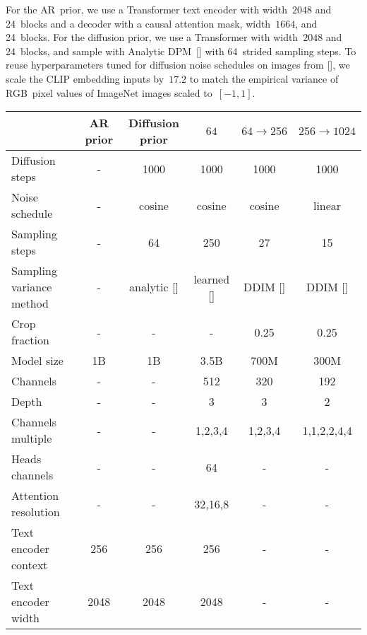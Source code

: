\documentclass{article}
\newcommand{\shortcite}[1]{[\citenum{#1}]}
\newcommand{\namecite}[1]{\citeauthor{#1} [\citenum{#1}]}
\begin{document}
For the AR~prior, we use a Transformer text encoder with width~$2048$ and 24~blocks and a decoder with a causal attention mask, width~$1664$, and 24~blocks. For the diffusion prior, we use a Transformer with width~$2048$ and 24~blocks, and sample with Analytic DPM~\shortcite{analyticddpm} with 64~strided sampling steps. To reuse hyperparameters tuned for diffusion noise schedules on images from \namecite{sotapaper}, we scale the CLIP embedding inputs by~$17.2$ to match the empirical variance of RGB~pixel values of ImageNet images scaled to~$[-1, 1]$. 
\begin{table}[h]
    \setlength\tabcolsep{4pt}
    \begin{center}
    \begin{small}
    \begin{tabular}{lccccc}
    \toprule
                         & AR prior & Diffusion prior & $64$ & $64 \rightarrow 256$ & $256 \rightarrow 1024$\\
    \midrule
    Diffusion steps      & -         & 1000    & 1000    & 1000    & 1000 \\
    Noise schedule       & -         & cosine  & cosine  & cosine  & linear \\
    Sampling steps       & -         & 64      & 250     & 27      & 15 \\
    Sampling variance method & -     & analytic \shortcite{analyticddpm} & learned \shortcite{improved} & DDIM \shortcite{ddim}    & DDIM \shortcite{ddim} \\
    Crop fraction        & -         & -       & -       & 0.25    & 0.25 \\
    Model size           & 1B        & 1B      & 3.5B    & 700M    & 300M \\
    Channels             & -         & -       & 512     & 320     & 192 \\
    Depth                & -         & -       & 3       & 3       & 2 \\
    Channels multiple    & -         & -       & 1,2,3,4 & 1,2,3,4 & 1,1,2,2,4,4 \\
    Heads channels       & -         & -       & 64      & -       & - \\
    Attention resolution & -         & -       & 32,16,8 & -       & - \\
    Text encoder context    & 256       & 256     & 256     & -       & - \\
    Text encoder width      & 2048      & 2048    & 2048    & -       & - \\

\end{tabular}
\end{small}
\end{center}
\end{table}
\end{document}
